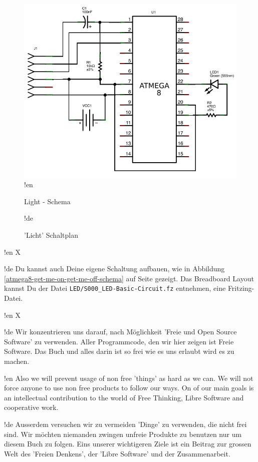 \documentclass[twoside,12pt,authoryear,openright]{book}
\begin{document}
\begin{figure}[htbp]
  \centering
  \includegraphics[width=120mm]{LED/S000_let-there-be-light/schema_circuit.png}
!en  \caption{Light - Schema}
!de  \caption{'Licht' Schaltplan}
  \label{atmega8-let-there-be-light-schema}
\end{figure}



!en X

!de Du kannst auch Deine eigene Schaltung aufbauen, wie in Abbildung \ref{atmega8-get-me-on-get-me-off-schema} auf Seite \pageref{atmega8-get-me-on-get-me-off-schema} gezeigt. Das Breadboard Layout kannst Du der Datei \texttt{LED/S000\_LED-Basic-Circuit.fz} entnehmen, eine Fritzing-Datei.



!en X

!de Wir konzentrieren uns darauf, nach Möglichkeit 'Freie und Open Source Software' zu verwenden. Aller Programmcode, den wir hier zeigen ist Freie Software. Das Buch und alles darin ist so frei wie es uns erlaubt wird es zu machen.



!en Also we will prevent usage of non free 'things' as hard as we can. We will not force anyone to use non free products to follow our ways. On of our main goals is an intellectual contribution to the world of Free Thinking, Libre Software and cooperative work.

!de Ausserdem versuchen wir zu vermeiden 'Dinge' zu verwenden, die nicht frei sind. Wir möchten niemanden zwingen unfreie Produkte zu benutzen nur um diesem Buch zu folgen. Eins unserer wichtigeren Ziele ist ein Beitrag zur grossen Welt des 'Freien Denkens', der 'Libre Software' und der Zusammenarbeit.
\end{document}
